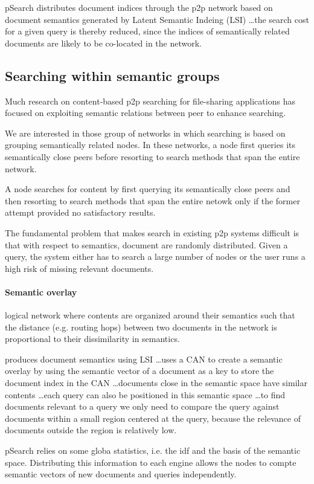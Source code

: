 pSearch \cite{TXD03} distributes document indices through the p2p network based on document semantics generated by Latent Semantic Indeing (LSI) \ldots the search cost for a given query is thereby reduced, since the indices of semantically related documents are likely to be co-located in the network.



\subsection{Searching within semantic groups}
Much research on content-based p2p searching for file-sharing applications has focused on exploiting semantic relations between peer to enhance searching.

We are interested in those group of networks in which searching is based on grouping semantically related nodes. In these networks, a node first queries its semantically close peers before resorting to search methods that span the entire network.

A node searches for content by first querying its semantically close peers and then resorting to search methods that span the entire netowk only if the former attempt provided no satisfactory results.

The fundamental problem that makes search in existing p2p systems difficult is that with respect to semantics, document are randomly distributed. Given a query, the system either has to search a large number of nodes or the user runs a high risk of missing relevant documents.

\paragraph{Semantic overlay} logical network where contents are organized around their semantics such that the distance (e.g. routing hops) between two documents in the network is proportional to their dissimilarity in semantics.

\cite{TXD03} produces document semantics using LSI \ldots uses a CAN to create a semantic overlay by using the semantic vector of a document as a key to store the document index in the CAN \ldots documents close in the semantic space have similar contents \ldots each query can also be positioned in this semantic space \ldots to find documents relevant to a query we only need to compare the query against documents within a small region centered at the query, because the relevance of documents outside the region is relatively low.

pSearch \cite{TXD03} relies on some globa statistics, i.e. the idf and the basis of the semantic space. Distributing this information to each engine allows the nodes to compte semantic vectors of new documents and queries independently.

